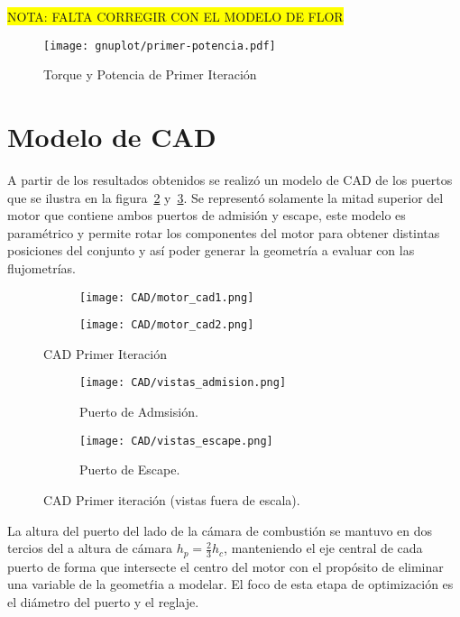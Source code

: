 \parbox{.5\textwidth}{\colorbox{yellow}{NOTA: FALTA CORREGIR CON EL MODELO DE
FLOR}}


\begin{figure}[ht]
  \centering
  \texttt{[image: gnuplot/primer-potencia.pdf]}
  \caption{Torque y Potencia de Primer Iteración} \label{fig:PoTi_primer_op}
\end{figure}



\section{Modelo de CAD}
%
A partir de los resultados obtenidos se realizó un modelo de CAD de los puertos
que se ilustra en la figura~\ref{fig:motor_cad1} y~\ref{fig:motor_cad2}.
%
Se representó solamente la mitad superior del motor que contiene ambos puertos
de admisión y escape, este modelo es paramétrico y permite rotar los componentes
del motor para obtener distintas posiciones del conjunto y así poder generar la
geometría a evaluar con las flujometrías.


\begin{figure}[ht]
  \centering
    \begin{subfigure}{0.4\textwidth}
        \centering
        \texttt{[image: CAD/motor\_cad1.png]}
    \end{subfigure}
    \hfill
    \begin{subfigure}{0.4\textwidth}
        \centering
        \texttt{[image: CAD/motor\_cad2.png]}
    \end{subfigure}
  \caption{CAD Primer Iteración}\label{fig:motor_cad1}
\end{figure}


\begin{figure}[ht]
  \centering
    \begin{subfigure}{0.8\textwidth}
        \centering
        \texttt{[image: CAD/vistas\_admision.png]}
        \caption{Puerto de Admsisión.}
    \end{subfigure}
    \begin{subfigure}{0.8\textwidth}
        \centering
        \texttt{[image: CAD/vistas\_escape.png]}
        \caption{Puerto de Escape.}
    \end{subfigure}
  \caption{CAD Primer iteración (vistas fuera de escala).}\label{fig:motor_cad2}
\end{figure}

La altura del puerto del lado de la cámara de combustión se mantuvo en dos
tercios del a altura de cámara $h_{p} = \frac{2}{3}h_{c}$, manteniendo el eje
central de cada puerto de forma que intersecte el centro del motor con el
propósito de eliminar una variable de la geometŕia a modelar.
%
El foco de esta etapa de optimización es el diámetro del puerto y el reglaje.
%

